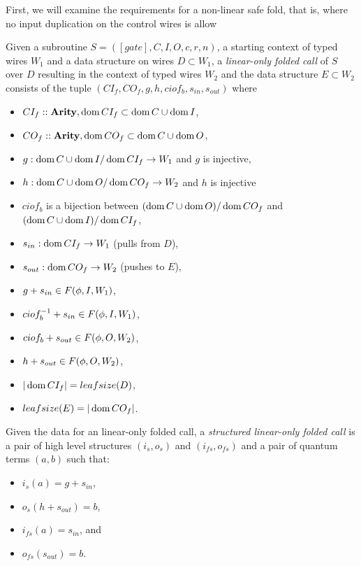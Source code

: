 First, we will examine the requirements for a non-linear
safe fold, that is, where no input duplication on the
control wires is allow



\begin{definition}\label{def:linear_only_subroutine_fold}
  Given a subroutine $S=([gate],C,I,O,c,r,n)$, a starting context of
  typed wires $W_1$ and a data structure on wires $D\subset W_1$, a
  \emph{linear-only folded call} of $S$ over $D$ resulting in the context
  of typed wires $W_2$ and the data structure $E\subset W_2$ consists of the
  tuple $(CI_f,CO_f,  g, h, ciof_b, s_{in}, s_{out})$ where
  \begin{itemize}
    \item $CI_f::\mathbf{{Arity}}, \operatorname*{dom}{CI_f} \subset \operatorname*{dom}{C}\cup \operatorname*{dom}{I}$,
    \item $CO_f::\mathbf{{Arity}}, \operatorname*{dom}{CO_f} \subset \operatorname*{dom}{C}\cup \operatorname*{dom}{O}$,
    \item $g:\operatorname*{dom}{C}\cup\operatorname*{dom} I / \operatorname*{dom}{CI_f} \to W_1$ and $g$ is injective,
    \item $h:\operatorname*{dom}{C}\cup\operatorname*{dom} O /\operatorname*{dom}{CO_f} \to W_2$ and $h$ is injective
    \item $ciof_b$ is a bijection between $(\operatorname*{dom}{C}\cup\operatorname*{dom}{O})/\operatorname*{dom}{CO_f}$
      and $(\operatorname*{dom}{C}\cup\operatorname*{dom}{I})/\operatorname*{dom}{CI_f}$,
    \item $s_{in}: \operatorname*{dom}{CI_f} \to W_1$ (pulls from $D$),
    \item $s_{out}: \operatorname*{dom}{CO_f} \to W_2$ (pushes to $E$),
    \item $g + s_{in} \in F(\phi,I,W_1)$,
    \item $ciof_b^{-1} + s_{in} \in F(\phi,I,W_1)$,
    \item $ciof_b + s_{out} \in F(\phi,O,W_2)$,
    \item $h + s_{out} \in F(\phi,O,W_2)$,
    \item $|\operatorname*{dom}{CI_f}| = leafsize(D)$,
    \item $leafsize(E) = |\operatorname*{dom}{CO_f}|$.
  \end{itemize}
\end{definition}

\begin{definition}\label{def:structured_linear_folded_call}
  Given the data for an linear-only folded call,
  a \emph{structured linear-only folded call} is a pair of high level
  structures $(i_s,o_s)$ and $(i_{fs},o_{fs})$  and a pair of quantum
  terms $(a,b)$ such that:
  \begin{itemize}
    \item $i_s(a) = g + s_{in}$,
    \item $o_s(h + s_{out}) = b$,
    \item $i_{fs}(a) = s_{in}$, and
    \item $o_{fs}(s_{out}) = b$.
  \end{itemize}

\end{definition}

